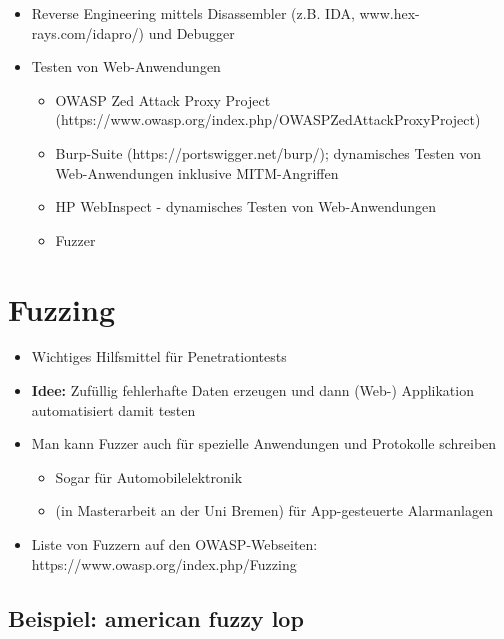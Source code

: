 \documentclass[openany]{book}
\begin{document}
\begin{itemize}
    \item Reverse Engineering mittels Disassembler (z.B. IDA, www.hex-rays.com/idapro/) und Debugger
    \item Testen von Web-Anwendungen
    \begin{itemize}
        \item OWASP Zed Attack Proxy Project (https://www.owasp.org/index.php/OWASP\textunderscore Zed\textunderscore Attack\textunderscore Proxy\textunderscore Project)
        \item Burp-Suite (https://portswigger.net/burp/); dynamisches Testen von Web-Anwendungen inklusive MITM-Angriffen
        \item HP WebInspect - dynamisches Testen von Web-Anwendungen
        \item Fuzzer
    \end{itemize}
\end{itemize}

\section{Fuzzing}

\begin{itemize}
    \item Wichtiges Hilfsmittel für Penetrationtests
    \item \textbf{Idee:} Zufüllig fehlerhafte Daten erzeugen und dann (Web-) Applikation automatisiert damit testen
    \item Man kann Fuzzer auch für spezielle Anwendungen und Protokolle schreiben
    \begin{itemize}
        \item Sogar für Automobilelektronik
        \item (in Masterarbeit an der Uni Bremen) für App-gesteuerte Alarmanlagen
    \end{itemize}
    \item Liste von Fuzzern auf den OWASP-Webseiten: https://www.owasp.org/index.php/Fuzzing
\end{itemize}

\subsection{Beispiel: american fuzzy lop}
\end{document}
